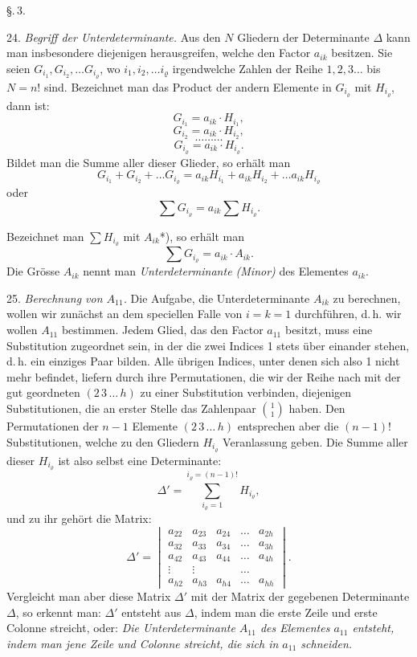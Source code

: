 \begin{center}
\S.\,3.\\
\end{center}

24. \textit{Begriff der Unterdeterminante.} Aus den $N$ Gliedern der
Determinante $\Delta$ kann man insbesondere diejenigen herausgreifen, welche
den Factor $a_{ik}$ besitzen. Sie seien $G_{i_1}, G_{i_2}, \dots G_{i_\varrho}$,
wo $i_1, i_2, \dots i_\varrho$ irgendwelche Zahlen der Reihe $1, 2, 3 \dots$
bis $N = n!$ sind. Bezeichnet man das Product der andern Elemente in
$G_{i_\varrho}$ mit $H_{i_\varrho}$, dann ist:
\[
G_{i_1} = a_{ik} \cdot H_{i_1},
\]
\[
G_{i_2} = a_{ik} \cdot H_{i_2},
\]
\[
\dots\dots\dots
\]
\[
G_{i_\varrho} = a_{ik} \cdot H_{i_\varrho}.
\]
Bildet man die Summe aller dieser Glieder, so erh\"alt man
\[
G_{i_1} + G_{i_2} + \dots G_{i_\varrho} = a_{ik} H_{i_1} + a_{ik} H_{i_2} +
\dots a_{ik} H_{i_\varrho}
\]
oder
\[
\sum G_{i_\varrho} = a_{ik} \sum H_{i_\varrho}.
\]


Bezeichnet man $\sum H_{i_\varrho}$ mit $A_{ik}$*), so erh\"alt man
\[
\sum G_{i_\varrho} = a_{ik} \cdot A_{ik}.
\]
Die Gr\"osse $A_{ik}$ nennt man \textit{Unterdeterminante (Minor)} des
Elementes $a_{ik}$.

25. \textit{Berechnung von $A_{11}$.} Die Aufgabe, die Unterdeterminante
$A_{ik}$ zu berechnen, wollen wir zun\"achst an dem speciellen Falle von
$i = k = 1$ durchf\"uhren, d.\,h. wir wollen $A_{11}$ bestimmen. Jedem Glied,
das den Factor $a_{11}$ besitzt, muss eine Substitution zugeordnet sein, in
der die zwei Indices 1 stets \"uber einander stehen, d.\,h. ein einziges Paar
bilden. Alle \"ubrigen Indices, unter denen sich also 1 nicht mehr befindet,
liefern durch ihre Permutationen, die wir der Reihe nach mit der gut
geordneten $(2\,3\,\dots\,h)$ zu einer Substitution verbinden, diejenigen
Substitutionen, die an erster Stelle das Zahlenpaar $\binom{1}{1}$ haben. Den
Permutationen der $n-1$ Elemente $(2\,3\,\dots\,h)$ entsprechen aber die
$(n-1)!$ Substitutionen, welche zu den Gliedern $H_{i_\varrho}$ Veranlassung
geben. Die Summe aller dieser $H_{i_\varrho}$ ist also selbst eine
Determinante:
\[
\Delta' = \sum_{i_\varrho = 1}^{i_\varrho = (n-1)!} H_{i_\varrho},
\]
und zu ihr geh\"ort die Matrix:
\[
\Delta' =
\begin{vmatrix}
a_{22} & a_{23} & a_{24} & \dots & a_{2h} \\
a_{32} & a_{33} & a_{34} & \dots & a_{3h} \\
a_{42} & a_{43} & a_{44} & \dots & a_{4h} \\
\vdots & \vdots & & \dots & \\
a_{h2} & a_{h3} & a_{h4} & \dots & a_{hh}
\end{vmatrix}.
\]
Vergleicht man aber diese Matrix $\Delta'$ mit der Matrix der gegebenen
Determinante $\Delta$, so erkennt man: $\Delta'$ entsteht aus $\Delta$, indem
man die erste Zeile und erste Colonne streicht, oder: \textit{Die
Unterdeterminante $A_{11}$ des Elementes $a_{11}$ entsteht, indem man jene
Zeile und Colonne streicht, die sich in $a_{11}$ schneiden.}

